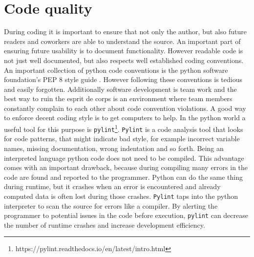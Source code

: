 \section{Code quality}
During coding it is important to ensure that not only the author, but also future readers and coworkers are able to understand the source. An important part of ensuring future usability is to document functionality. However readable code is not just well documented, but also respects well established coding conventions. An important collection of python code conventions is the python software foundation's PEP 8 style guide \cite{VanRossum2001}. However following these conventions is tedious and easily forgotten. Additionally software development is team work and the best way to ruin the esprit de corps is an environment where team members constantly complain to each other about code convention violations.
A good way to enforce decent coding style is to get computers to help. In the python world a useful tool for this purpose is \texttt{pylint}\footnote{https://pylint.readthedocs.io/en/latest/intro.html}. \texttt{Pylint} is a code analysis tool that looks for code patterns, that might indicate bad style, for example incorrect variable names, missing documentation, wrong indentation and so forth. 
Being an interpreted language python code does not need to be compiled. This advantage comes with an important drawback, because during compiling many errors in the code are found and reported to the programmer. Python can do the same thing during runtime, but it crashes when an error is encountered and already computed data is often lost during those crashes. \texttt{Pylint} taps into the python interpreter to scan the source for errors like a compiler. By alerting the programmer to potential issues in the code before execution, \texttt{pylint} can decrease the number of runtime crashes and increase development efficiency.    

